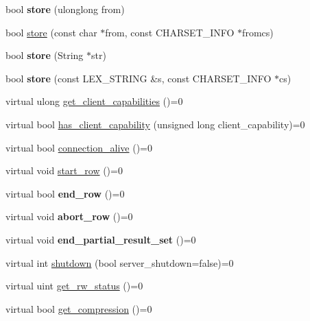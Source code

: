 \begin{DoxyCompactItemize}
bool {\bfseries store} (ulonglong from)
\item 
bool \mbox{\hyperlink{classProtocol_aa8bf8380dcfeb6df40de6a40f5485a7f}{store}} (const char $\ast$from, const C\+H\+A\+R\+S\+E\+T\+\_\+\+I\+N\+FO $\ast$fromcs)
\item 
\mbox{\label{classProtocol_a785ec8433646a7293a48a326752359e0}} 
bool {\bfseries store} (String $\ast$str)
\item 
\mbox{\label{classProtocol_ab19cb1dc9ce09fea3a3f922faccf6318}} 
bool {\bfseries store} (const L\+E\+X\+\_\+\+S\+T\+R\+I\+NG \&s, const C\+H\+A\+R\+S\+E\+T\+\_\+\+I\+N\+FO $\ast$cs)
\item 
virtual ulong \mbox{\hyperlink{classProtocol_afc5e8ccb3c29f4b78f7f68cf00b6a713}{get\+\_\+client\+\_\+capabilities}} ()=0
\item 
virtual bool \mbox{\hyperlink{classProtocol_aea1d05eaf76707b3772a00a43ea0e49b}{has\+\_\+client\+\_\+capability}} (unsigned long client\+\_\+capability)=0
\item 
virtual bool \mbox{\hyperlink{classProtocol_af4ed0f36d7e3458766d522432bf4f2d5}{connection\+\_\+alive}} ()=0
\item 
virtual void \mbox{\hyperlink{classProtocol_a6935bf41e00716012ba86e1f5c4b055b}{start\+\_\+row}} ()=0
\item 
\mbox{\label{classProtocol_a724fab7f9d70946691413f0eb6918574}} 
virtual bool {\bfseries end\+\_\+row} ()=0
\item 
\mbox{\label{classProtocol_a4a133181418b4d411e29abdc9d05ebea}} 
virtual void {\bfseries abort\+\_\+row} ()=0
\item 
\mbox{\label{classProtocol_af98a04182a8e41b79dd7370913f3e5c8}} 
virtual void {\bfseries end\+\_\+partial\+\_\+result\+\_\+set} ()=0
\item 
virtual int \mbox{\hyperlink{classProtocol_a63405d2f87f50f33ee57fcd4de65ae24}{shutdown}} (bool server\+\_\+shutdown=false)=0
\item 
virtual uint \mbox{\hyperlink{classProtocol_a869af76c99d8e668112b65f7a2338ac8}{get\+\_\+rw\+\_\+status}} ()=0
\item 
virtual bool \mbox{\hyperlink{classProtocol_a7b500a3f2e52a98903d853b8f365ac7d}{get\+\_\+compression}} ()=0
\item 

\end{DoxyCompactItemize}
